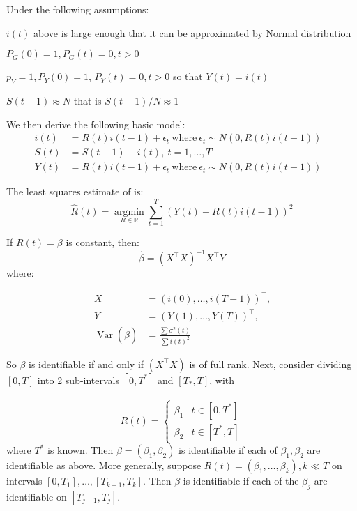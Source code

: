 Under the following assumptions:

\begin{assumption}
    \label{assm:i-normal}
    $i(t)$ above is large enough that it can be approximated by Normal distribution
\end{assumption}
\begin{assumption}
    \label{assm:pg=1}
    $P_G(0) = 1, P_G(t) = 0, t > 0$
\end{assumption}
\begin{assumption}
    \label{assm:py=1}
    $p_Y = 1, P_Y(0) = 1$, $P_Y(t) = 0, t > 0$ so that $Y(t) = i(t)$
\end{assumption}
\begin{assumption}
    \label{assm:s=N}
    $S(t-1) \approx N$ that is $S(t-1)/N \approx 1$
\end{assumption}

We then derive the following basic model:
\begin{align}
    i(t) & = R(t) i(t-1) + \epsilon_t ~ \text{where} ~ \epsilon_t \sim N(0, R(t)i(t-1)) & \nonumber \\
    S(t) & = S(t - 1) - i(t), ~t=1,\ldots,T & \nonumber \\
    Y(t) & = R(t) i(t-1) + \epsilon_t ~ \text{where} ~ \epsilon_t \sim N(0, R(t)i(t-1))  \label{eq:Y-basic} &
\end{align}

The least squares estimate of  is:
\begin{equation}
    \label{eq:r-hat-basic}
    \hat{R}(t) = \mathop{\mathrm{argmin}}\limits_{R \in \mathbb{R}} \sum\limits_{t=1}^{T} {\left( Y(t) - R(t)i(t-1) \right)^2}
\end{equation}

If $R(t) = \beta$ is constant, then:
$$\hat{\beta} = \left(X^{\top} X\right)^{-1}X^{\top} Y$$
where:

\begin{align*}
    X & = (i(0), \ldots, i(T-1))^{\top} \text{,} \\
    Y & = (Y(1), \ldots, Y(T))^{\top} \text{,} \\
    \operatorname{Var}(\hat{\beta}) & = \frac{\sum{\sigma^2(t)}}{\sum{i(t)^2}}
\end{align*}

So $\beta$ is identifiable if and only if $(X^{\top}X)$ is of full rank.
Next, consider dividing $[0,T]$ into 2 sub-intervals $[0, T^{*}]$ and $[T_{*}, T]$, with

$$
    R(t) =
    \begin{cases}
        \beta_1 & t \in [0,T^{*}] \\
        \beta_2 & t \in [T^{*}, T]
    \end{cases}
$$
where $T^{*}$ is known.
Then $\beta = (\beta_1, \beta_2)$ is identifiable if each of $\beta_1, \beta_2$ are identifiable as above.
More generally, suppose $R(t) = (\beta_1, \ldots, \beta_k), k \ll T$ on intervals $[0, T_1], \ldots, [T_{k-1}, T_k]$. Then $\beta$ is identifiable if each of the $\beta_j$ are identifiable on $[T_{j-1}, T_j]$.

